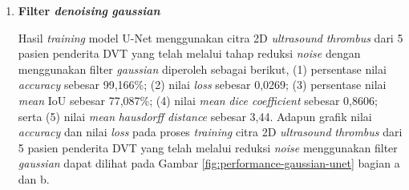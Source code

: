 \begin{enumerate}
	\item \textbf{Filter \textit{denoising} \textit{gaussian}} 
	
	Hasil \textit{training} model U-Net menggunakan citra 2D \textit{ultrasound} \textit{thrombus} dari 5 pasien penderita DVT yang telah melalui tahap reduksi \textit{noise} dengan menggunakan filter \textit{gaussian} diperoleh sebagai berikut, (1) persentase nilai \textit{accuracy} sebesar 99,166\%; (2) nilai \textit{loss} sebesar 0,0269; (3) persentase nilai \textit{mean} IoU sebesar 77,087\%; (4) nilai \textit{mean} \textit{dice coefficient} sebesar 0,8606; serta (5) nilai \textit{mean} \textit{hausdorff distance} sebesar 3,44. Adapun grafik nilai \textit{accuracy} dan nilai \textit{loss} pada proses \textit{training} citra 2D \textit{ultrasound} \textit{thrombus} dari 5 pasien penderita DVT yang telah melalui reduksi \textit{noise} menggunakan filter \textit{gaussian} dapat dilihat pada Gambar \ref{fig:performance-gaussian-unet} bagian a dan b.
	

\end{enumerate}
